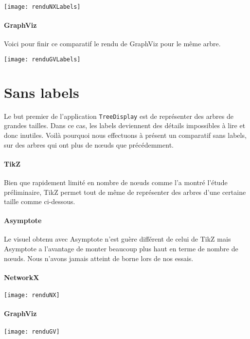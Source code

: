 \begin{center}
\texttt{[image: renduNXLabels]}
\end{center}
	
\paragraph{GraphViz} Voici pour finir ce comparatif le rendu de GraphViz pour le même arbre.\\

\begin{center}
\texttt{[image: renduGVLabels]}
\end{center}
	
	\section{Sans labels}
	
\paragraph{}Le but premier de l'application \verb|TreeDisplay| est de représenter des arbres de grandes tailles. Dans ce cas, les labels deviennent des détails impossibles à lire et donc inutiles. Voilà pourquoi nous effectuons à présent un comparatif sans labels, sur des arbres qui ont plus de n\oe uds que précédemment.

\paragraph{TikZ} Bien que rapidement limité en nombre de n\oe uds comme l'a montré l'étude préliminaire, TikZ permet tout de même de représenter des arbres d'une certaine taille comme ci-dessous.

\begin{center}
\resizebox {!}{0.50\columnwidth} {
}
\end{center}

\paragraph{Asymptote} Le visuel obtenu avec Asymptote n'est guère différent de celui de TikZ mais Asymptote a l'avantage de monter beaucoup plus haut en terme de nombre de n\oe uds. Nous n'avons jamais atteint de borne lors de nos essais.

\begin{center}

\end{center}

\paragraph{NetworkX}

\begin{center}
\texttt{[image: renduNX]}
\end{center}
	
\paragraph{GraphViz}

\begin{center}
\texttt{[image: renduGV]}
\end{center}